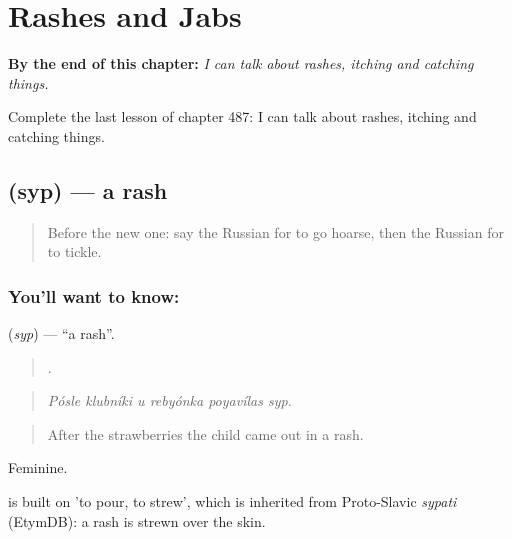 
\chapter{Rashes and Jabs}
\label{ch:ru-rashes-and-jabs}

\begin{chapteropening}
\textbf{By the end of this chapter:} \emph{I can talk about rashes, itching and catching things.}

Complete the last lesson of chapter 487: I can talk about rashes, itching and catching things.
\end{chapteropening}

\section[\texorpdfstring{\ru{сыпь} (syp)}{сыпь (syp)}]{ (syp) — a rash}

\label{lesson:RU-C487-syp}



\begin{quote}
Before the new one: say the Russian for to go hoarse, then the Russian for to tickle.
\end{quote}

\subsection*{You'll want to know: }
\textbf{} (\emph{syp}) — \textquotedblleft{}a rash\textquotedblright{}.

\begin{quote}
     .
\end{quote}

\begin{quote}
\emph{Pósle klubníki u rebyónka poyavílas syp.}
\end{quote}

\begin{quote}
After the strawberries the child came out in a rash.
\end{quote}

Feminine.

\begin{cousinweb}
\emph{} is built on \emph{} 'to pour, to strew', which is inherited from Proto-Slavic \emph{sypati} (EtymDB): a rash is strewn over the skin.
\end{cousinweb}

